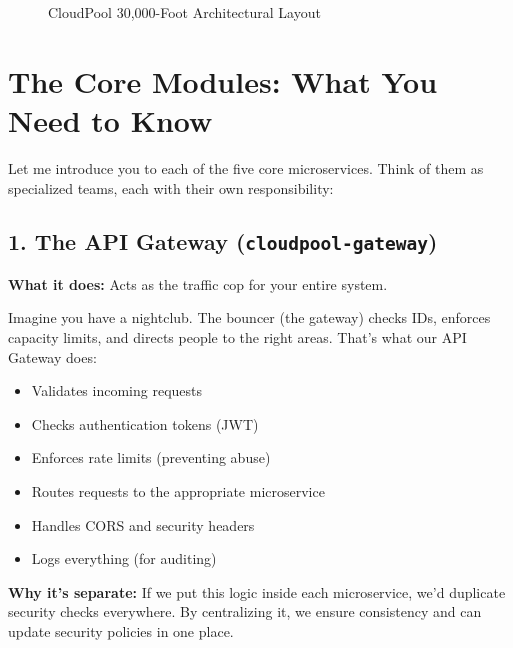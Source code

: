\documentclass[11pt,a4paper]{report}
\begin{document}
\begin{figure}[htbp]
\caption{CloudPool 30,000-Foot Architectural Layout}
\label{fig:architecture}
\end{figure}


\section{The Core Modules: What You Need to Know}


Let me introduce you to each of the five core microservices. Think of them as specialized teams, each with their own responsibility:


\subsection{1. \textbf{The API Gateway} (\texttt{cloudpool-gateway})}

\textbf{What it does:} Acts as the traffic cop for your entire system.

Imagine you have a nightclub. The bouncer (the gateway) checks IDs, enforces capacity limits, and directs people to the right areas. That's what our API Gateway does:

\begin{itemize}
\item Validates incoming requests
\item Checks authentication tokens (JWT)
\item Enforces rate limits (preventing abuse)
\item Routes requests to the appropriate microservice
\item Handles CORS and security headers
\item Logs everything (for auditing)

\end{itemize}
\textbf{Why it's separate:} If we put this logic inside each microservice, we'd duplicate security checks everywhere. By centralizing it, we ensure consistency and can update security policies in one place.
\end{document}

